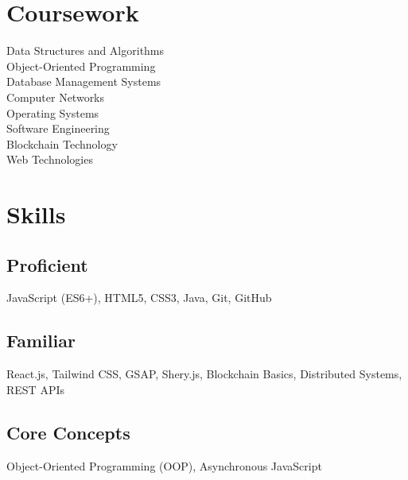 \documentclass[11pt]{deedy-resume-openfont}
\begin{document}
\begin{minipage}[t]{0.33\textwidth}
\section{Coursework}
Data Structures and Algorithms \\
Object-Oriented Programming \\
Database Management Systems \\
Computer Networks \\
Operating Systems \\
Software Engineering \\
Blockchain Technology \\
Web Technologies \\

\section{Skills}
\subsection{Proficient}
JavaScript (ES6+), HTML5, CSS3, Java, Git, GitHub

\subsection{Familiar}
React.js, Tailwind CSS, GSAP, Shery.js, Blockchain Basics, Distributed Systems, REST APIs

\subsection{Core Concepts}
Object-Oriented Programming (OOP), Asynchronous JavaScript
\sectionsep

\end{minipage} 
\hspace{0.05\textwidth} %
\end{document}
